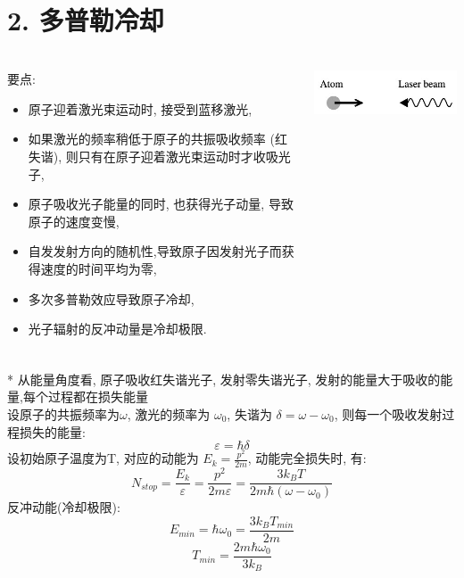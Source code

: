 \section{2. 多普勒冷却}

\begin{frame} 
\frametitle{}
\begin{columns}
    \begin{column}[t]{0.72\linewidth}
     要点:
     \begin{itemize}
         \item 原子迎着激光束运动时, 接受到蓝移激光,
         \item 如果激光的频率稍低于原子的共振吸收频率 (红失谐), 则只有在原子迎着激光束运动时才收吸光子,
         \item 原子吸收光子能量的同时, 也获得光子动量, 导致原子的速度变慢,
         \item 自发发射方向的随机性,导致原子因发射光子而获得速度的时间平均为零,
         \item 多次多普勒效应导致原子冷却, 
         \item 光子辐射的反冲动量是冷却极限.
     \end{itemize}
    \end{column}
    \begin{column}[t]{0.28\linewidth} 
       \begin{center}
            \includegraphics[width=1.0\textwidth]{figs/2022-05-30-12-11-01.png}
       \end{center}
    \end{column}
\end{columns} 
\end{frame}

\begin{frame} 
\frametitle{}
* 从能量角度看, 原子吸收红失谐光子, 发射零失谐光子, 发射的能量大于吸收的能量,每个过程都在损失能量 \\ 
设原子的共振频率为$ \omega $,  激光的频率为 $ \omega_0 $, 失谐为 $ \delta=\omega-\omega_0 $, 则每一个吸收发射过程损失的能量:
\[ \varepsilon = \hbar \delta \]
设初始原子温度为T, 对应的动能为 $E_k=\frac{p^2}{2m}$, 动能完全损失时, 有:
\[ N_{stop}= \frac{E_k}{\varepsilon} = \frac{p^2}{2m \varepsilon}= \frac{ 3 k_B T }{2m\hbar (\omega-\omega_0) } \]
反冲动能(冷却极限): 
\[ E_{min} = \hbar \omega_0=\frac{3 k_B T_{min}}{2m}\]
\[ T_{min} = \frac{2 m \hbar \omega_0}{3 k_B} \]
\end{frame}

